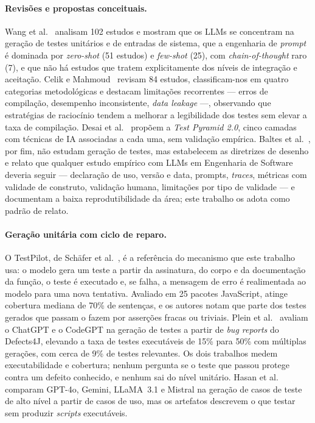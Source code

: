 \documentclass[12pt]{article}
\begin{document}
\paragraph{Revisões e propostas conceituais.} Wang et
al.~\cite{wang2024survey} analisam 102 estudos e mostram que os LLMs se
concentram na geração de testes unitários e de entradas de sistema, que a
engenharia de \textit{prompt} é dominada por \textit{zero-shot} (51 estudos)
e \textit{few-shot} (25), com \textit{chain-of-thought} raro (7), e que não
há estudos que tratem explicitamente dos níveis de integração e aceitação.
Celik e Mahmoud~\cite{celik2025review} revisam 84 estudos, classificam-nos em
quatro categorias metodológicas e destacam limitações recorrentes --- erros
de compilação, desempenho inconsistente, \textit{data leakage} ---,
observando que estratégias de raciocínio tendem a melhorar a legibilidade dos
testes sem elevar a taxa de compilação. Desai et
al.~\cite{desai2025testpyramid} propõem a \textit{Test Pyramid 2.0}, cinco
camadas com técnicas de IA associadas a cada uma, sem validação empírica.
Baltes et al.~\cite{baltes2026guidelines}, por fim, não estudam geração de
testes, mas estabelecem as diretrizes de desenho e relato que qualquer estudo
empírico com LLMs em Engenharia de Software deveria seguir --- declaração de
uso, versão e data, prompts, \textit{traces}, métricas com validade de
construto, validação humana, limitações por tipo de validade --- e
documentam a baixa reprodutibilidade da área; este trabalho os adota como
padrão de relato.

\paragraph{Geração unitária com ciclo de reparo.} O TestPilot, de Schäfer et
al.~\cite{schafer2024testpilot}, é a referência do mecanismo que este
trabalho usa: o modelo gera um teste a partir da assinatura, do corpo e da
documentação da função, o teste é executado e, se falha, a mensagem de erro
é realimentada ao modelo para uma nova tentativa. Avaliado em 25 pacotes
JavaScript, atinge cobertura mediana de 70\% de sentenças, e os autores
notam que parte dos testes gerados que passam o fazem por asserções fracas
ou triviais. Plein et al.~\cite{plein2023bugreports} avaliam o ChatGPT e o
CodeGPT na geração de testes a partir de \textit{bug reports} do Defects4J,
elevando a taxa de testes executáveis de 15\% para 50\% com múltiplas
gerações, com cerca de 9\% de testes relevantes. Os dois trabalhos medem
executabilidade e cobertura; nenhum pergunta se o teste que passou protege
contra um defeito conhecido, e nenhum sai do nível unitário. Hasan et
al.~\cite{hasan2025highlevel} comparam GPT-4o, Gemini, LLaMA~3.1 e Mistral na
geração de casos de teste de alto nível a partir de casos de uso, mas os
artefatos descrevem o que testar sem produzir \textit{scripts} executáveis.
\end{document}
